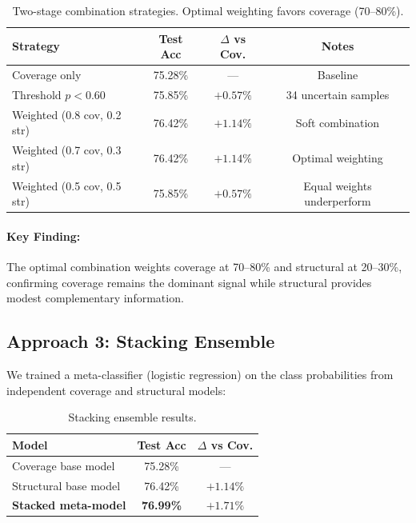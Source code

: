 \documentclass[12pt,a4paper]{article}
\begin{document}
\begin{table}[h]
\centering
\begin{tabular}{lccc}
\hline
\textbf{Strategy} & \textbf{Test Acc} & \textbf{$\Delta$ vs Cov.} & \textbf{Notes} \\
\hline
Coverage only & 75.28\% & --- & Baseline \\
Threshold $p < 0.60$ & 75.85\% & $+0.57\%$ & 34 uncertain samples \\
Weighted (0.8 cov, 0.2 str) & 76.42\% & $+1.14\%$ & Soft combination \\
Weighted (0.7 cov, 0.3 str) & 76.42\% & $+1.14\%$ & Optimal weighting \\
Weighted (0.5 cov, 0.5 str) & 75.85\% & $+0.57\%$ & Equal weights underperform \\
\hline
\end{tabular}
\caption{Two-stage combination strategies. Optimal weighting favors coverage (70--80\%).}
\label{tab:hybrid_twostage}
\end{table}

\paragraph{Key Finding:} The optimal combination weights coverage at 70--80\% and structural
at 20--30\%, confirming coverage remains the dominant signal while structural provides
modest complementary information.

\subsection{Approach 3: Stacking Ensemble}

We trained a meta-classifier (logistic regression) on the class probabilities from
independent coverage and structural models:

\begin{table}[h]
\centering
\begin{tabular}{lcc}
\hline
\textbf{Model} & \textbf{Test Acc} & \textbf{$\Delta$ vs Cov.} \\
\hline
Coverage base model & 75.28\% & --- \\
Structural base model & 76.42\% & $+1.14\%$ \\
\textbf{Stacked meta-model} & \textbf{76.99\%} & $+1.71\%$ \\
\hline
\end{tabular}
\caption{Stacking ensemble results.}
\label{tab:hybrid_stacking}
\end{table}
\end{document}
